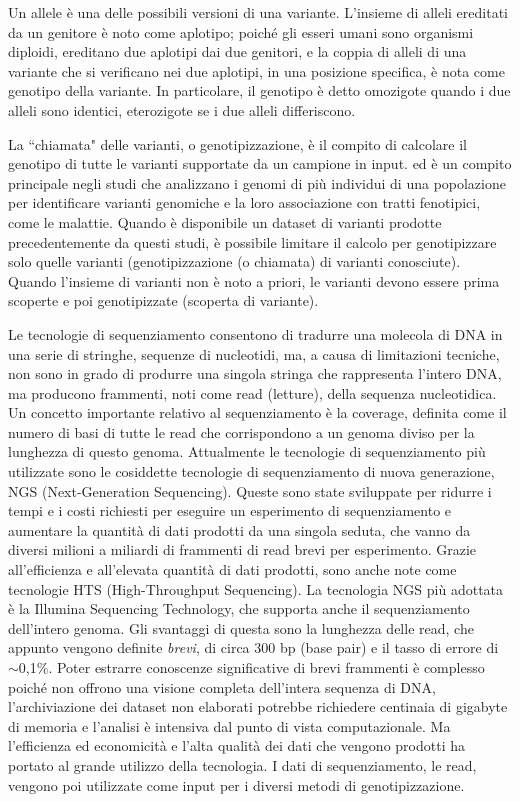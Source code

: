 \documentclass[../main.tex]{subfiles}
\begin{document}
Un allele è una delle possibili versioni di una variante. L'insieme di alleli ereditati da un genitore è noto come aplotipo; poiché gli esseri umani sono organismi diploidi, ereditano due aplotipi dai due genitori, e la coppia di alleli di una variante che si verificano nei due aplotipi, in una posizione specifica, è nota come genotipo della variante. In particolare, il genotipo è detto omozigote quando i due alleli sono identici, eterozigote se i due alleli differiscono. 

La ``chiamata" delle varianti, o genotipizzazione, è il compito di calcolare il genotipo di tutte le varianti supportate da un campione in input. 
ed è un compito principale negli studi che analizzano i genomi di più individui di una popolazione per identificare varianti genomiche e la loro associazione con tratti fenotipici, come le malattie. Quando è disponibile un dataset di varianti prodotte precedentemente da questi studi, è possibile limitare il calcolo per genotipizzare solo quelle varianti (genotipizzazione (o chiamata) di varianti conosciute). Quando l'insieme di varianti non è noto a priori, le varianti devono essere prima scoperte e poi genotipizzate (scoperta di variante).

Le tecnologie di sequenziamento consentono di tradurre una molecola di DNA in una serie di stringhe, sequenze di nucleotidi, ma, a causa di limitazioni tecniche, non sono in grado di produrre una singola stringa che rappresenta l'intero DNA, ma producono frammenti, noti come read (letture), della sequenza nucleotidica. Un concetto importante relativo al sequenziamento è la coverage, definita come il numero di basi di tutte le read che corrispondono a un genoma diviso per la lunghezza di questo genoma. Attualmente le tecnologie di sequenziamento più utilizzate sono le cosiddette tecnologie di sequenziamento di nuova generazione, NGS (Next-Generation Sequencing). Queste sono state sviluppate per ridurre i tempi e i costi richiesti per eseguire un esperimento di sequenziamento e aumentare la quantità di dati prodotti da una singola seduta, che vanno da diversi milioni a miliardi di frammenti di read brevi per esperimento. Grazie all'efficienza e all'elevata quantità di dati prodotti, sono anche note come tecnologie HTS (High-Throughput Sequencing). La tecnologia NGS più adottata è la Illumina Sequencing Technology, che  supporta anche il sequenziamento dell'intero genoma. Gli svantaggi di questa sono la lunghezza delle read, che appunto vengono definite \textit{brevi}, di circa 300 bp (base pair) e il tasso di errore di  $\sim$0,1\%. Poter estrarre conoscenze significative di brevi frammenti è complesso poiché non offrono una visione completa dell'intera sequenza di DNA, l'archiviazione dei dataset non elaborati potrebbe richiedere centinaia di gigabyte di memoria e l'analisi è intensiva dal punto di vista computazionale. Ma l'efficienza ed economicità e l'alta qualità dei dati che vengono prodotti ha portato al grande utilizzo della tecnologia. I dati di sequenziamento, le read, vengono poi utilizzate come input per i diversi metodi di genotipizzazione.
\end{document}
